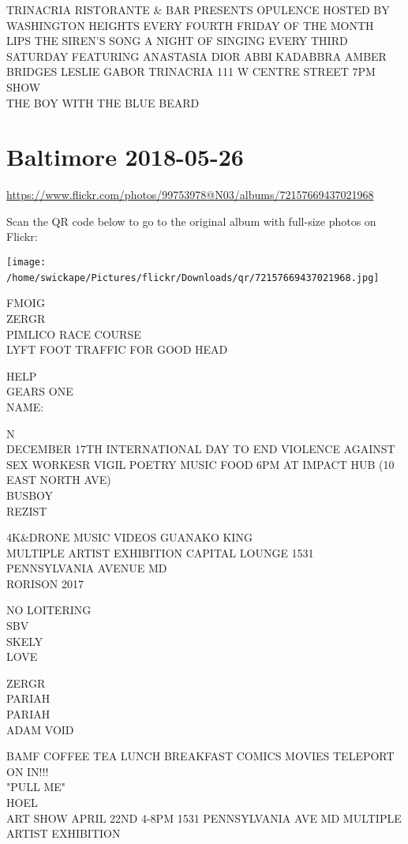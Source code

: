 \documentclass[10pt,letterpaper]{article}
\begin{document}
TRINACRIA RISTORANTE \& BAR PRESENTS OPULENCE HOSTED BY WASHINGTON HEIGHTS EVERY FOURTH FRIDAY OF THE MONTH\\
LIPS THE SIREN'S SONG A NIGHT OF SINGING EVERY THIRD SATURDAY FEATURING ANASTASIA DIOR ABBI KADABBRA AMBER BRIDGES LESLIE GABOR TRINACRIA 111 W CENTRE STREET 7PM SHOW\\
THE BOY WITH THE BLUE BEARD
\

\section*{Baltimore 2018-05-26}

\url{https://www.flickr.com/photos/99753978@N03/albums/72157669437021968}

Scan the QR code below to go to the original album with full-size photos on Flickr:

\texttt{[image: /home/swickape/Pictures/flickr/Downloads/qr/72157669437021968.jpg]}
\

FMOIG\\
ZERGR\\
PIMLICO RACE COURSE\\
LYFT FOOT TRAFFIC FOR GOOD HEAD

HELP\\
GEARS ONE\\
NAME:

N\\
DECEMBER 17TH INTERNATIONAL DAY TO END VIOLENCE AGAINST SEX WORKESR VIGIL POETRY MUSIC FOOD 6PM AT IMPACT HUB (10 EAST NORTH AVE)\\
BUSBOY\\
REZIST

4K\&DRONE MUSIC VIDEOS GUANAKO KING\\
MULTIPLE ARTIST EXHIBITION CAPITAL LOUNGE 1531 PENNSYLVANIA AVENUE MD\\
RORISON 2017

NO LOITERING\\
SBV\\
SKELY\\
LOVE

ZERGR\\
PARIAH\\
PARIAH\\
ADAM VOID

BAMF COFFEE TEA LUNCH BREAKFAST COMICS MOVIES TELEPORT ON IN!!!\\
"PULL ME"\\
HOEL\\
ART SHOW APRIL 22ND 4{-}8PM 1531 PENNSYLVANIA AVE MD MULTIPLE ARTIST EXHIBITION
\end{document}

